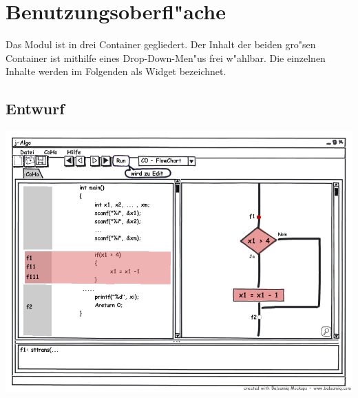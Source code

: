 ﻿\section{Benutzungsoberfl"ache}

\begin{description}
	Das Modul ist in drei Container gegliedert. Der Inhalt der beiden gro"sen Container ist mithilfe eines Drop-Down-Men"us frei w"ahlbar.
	Die einzelnen Inhalte werden im Folgenden als Widget bezeichnet.
\end{description}

\subsection{Entwurf}
\begin{center}
	\includegraphics[scale=0.50]{images/Mockup_xml_design.png}
\end{center}


